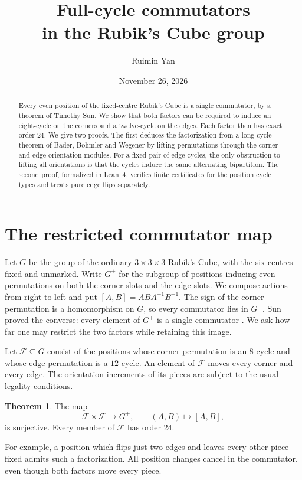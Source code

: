 \documentclass[11pt,letterpaper]{article}
\title{\fontsize{20}{24}\selectfont\bfseries Full-cycle commutators\\ in the Rubik's Cube group}
\author{Ruimin Yan}
\date{November 26, 2026}
\theoremstyle{definition}
\newtheorem{theorem}{Theorem}[section]
\theoremstyle{remark}
\newcommand{\FC}{\mathcal F}
\newcommand{\cl}[2]{[#1,#2]}
\begin{document}
\maketitle
\begin{abstract}
Every even position of the fixed-centre Rubik's Cube is a single commutator,
by a theorem of Timothy Sun. We show that both factors can be required to
induce an eight-cycle on the corners and a twelve-cycle on the edges.
Each factor then has exact order \(24\). We give two proofs. The first
deduces the factorization from a long-cycle theorem of Bader, B\"ohmler
and Wegener by lifting permutations through the corner and edge orientation
modules. For a fixed pair of edge cycles, the only obstruction to lifting
all orientations is that the cycles induce the same alternating
bipartition. The second proof, formalized in Lean~4, verifies finite
certificates for the position cycle types and treats pure edge flips
separately.
\end{abstract}

\section{The restricted commutator map}

Let \(G\) be the group of the ordinary \(3\times3\times3\) Rubik's Cube,
with the six centres fixed and unmarked. Write \(G^+\) for the subgroup
of positions inducing even permutations on both the corner slots and the
edge slots. We compose actions from right to left and put
\(\cl{A}{B}=ABA^{-1}B^{-1}\). The sign of the corner permutation is a
homomorphism on \(G\), so every commutator lies in \(G^+\). Sun proved the
converse: every element of \(G^+\) is a single commutator
\cite[Theorem~18]{sun}. We ask how far one may restrict the two factors
while retaining this image.

Let \(\FC\subseteq G\) consist of the positions whose corner permutation
is an \(8\)-cycle and whose edge permutation is a \(12\)-cycle. An element
of \(\FC\) moves every corner and every edge. The orientation increments
of its pieces are subject to the usual legality conditions.

\begin{theorem}\label{thm:main}
The map
\[
  \FC\times\FC\longrightarrow G^+,\qquad (A,B)\longmapsto\cl{A}{B},
\]
is surjective. Every member of \(\FC\) has order \(24\).
\end{theorem}

For example, a position which flips just two edges and leaves every
other piece fixed admits such a factorization. All position changes
cancel in the commutator, even though both factors move every piece.
\end{document}
